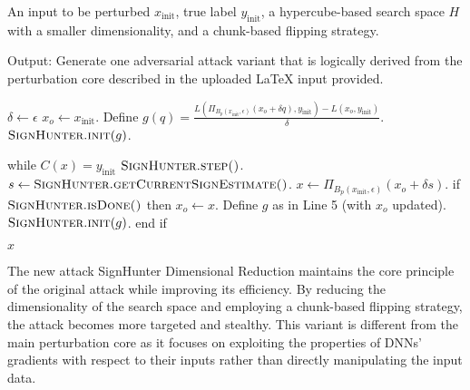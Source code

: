 An input to be perturbed $x_{\text{init}}$, true label $y_{\text{init}}$, a hypercube-based search space $H$ with a smaller dimensionality, and a chunk-based flipping strategy.

Output: Generate one adversarial attack variant that is logically derived from the perturbation core described in the uploaded LaTeX input provided.


$\delta \leftarrow \epsilon$
$x_o \leftarrow x_{\text{init}}$.
Define $g(q) = \frac{L(\Pi_{B_p(x_{\text{init}}, \epsilon)} (x_o + \delta q), y_{\text{init}}) - L(x_o, y_{\text{init}})}{\delta}$.
$\textsc{SignHunter.init}(g)$.

while $C(x) = y_{\text{init}}$
    $\textsc{SignHunter.step()}$.
    $s \leftarrow \textsc{SignHunter.getCurrentSignEstimate()}$.
    $x \leftarrow \Pi_{B_p(x_{\text{init}}, \epsilon)} (x_o + \delta s)$.
if $\textsc{SignHunter.isDone()}$ then
    $x_o \leftarrow x$.
    Define $g$ as in Line 5 (with $x_o$ updated).
    $\textsc{SignHunter.init}(g)$.
end if

$x$

The new attack SignHunter Dimensional Reduction maintains the core principle of the original attack while improving its efficiency. By reducing the dimensionality of the search space and employing a chunk-based flipping strategy, the attack becomes more targeted and stealthy. This variant is different from the main perturbation core as it focuses on exploiting the properties of DNNs' gradients with respect to their inputs rather than directly manipulating the input data.